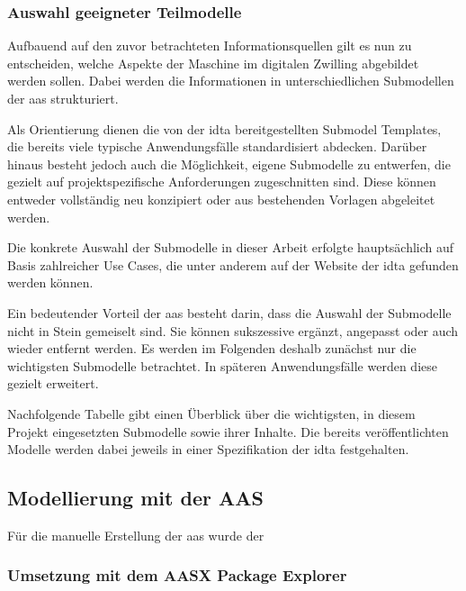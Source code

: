 \subsubsection{Auswahl geeigneter Teilmodelle}
Aufbauend auf den zuvor betrachteten Informationsquellen gilt es nun zu entscheiden, welche Aspekte der Maschine im digitalen Zwilling abgebildet werden sollen.
Dabei werden die Informationen in unterschiedlichen Submodellen der \acs{aas} strukturiert.

Als Orientierung dienen die von der \acs{idta} bereitgestellten Submodel Templates, die bereits viele typische Anwendungsfälle standardisiert abdecken.
Darüber hinaus besteht jedoch auch die Möglichkeit, eigene Submodelle zu entwerfen, die gezielt auf projektspezifische Anforderungen zugeschnitten sind.
Diese können entweder vollständig neu konzipiert oder aus bestehenden Vorlagen abgeleitet werden.

Die konkrete Auswahl der Submodelle in dieser Arbeit erfolgte hauptsächlich auf Basis zahlreicher Use Cases, die unter anderem auf der Website der \acs{idta} gefunden werden können.

Ein bedeutender Vorteil der \acs{aas} besteht darin, dass die Auswahl der Submodelle nicht in Stein gemeiselt sind.
Sie können sukszessive ergänzt, angepasst oder auch wieder entfernt werden.
Es werden im Folgenden deshalb zunächst nur die wichtigsten Submodelle betrachtet.
In späteren Anwendungsfälle werden diese gezielt erweitert.



Nachfolgende Tabelle gibt einen Überblick über die wichtigsten, in diesem Projekt eingesetzten Submodelle sowie ihrer Inhalte.
Die bereits veröffentlichten Modelle werden dabei jeweils in einer Spezifikation der \acs{idta} festgehalten.







\subsection{Modellierung mit der AAS}
Für die manuelle Erstellung der \acs{aas} wurde der
\subsubsection{Umsetzung mit dem AASX Package Explorer}
